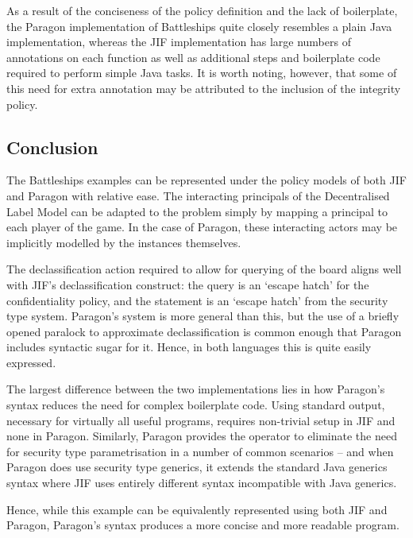 As a result of the conciseness of the policy definition and the lack of boilerplate, the Paragon implementation of Battleships quite closely resembles a plain Java implementation, whereas the JIF implementation has large numbers of annotations on each function as well as additional steps and boilerplate code required to perform simple Java tasks. It is worth noting, however, that some of this need for extra annotation may be attributed to the inclusion of the integrity policy.

\subsection{Conclusion}

The Battleships examples can be represented under the policy models of both JIF and Paragon with relative ease. The interacting principals of the Decentralised Label Model can be adapted to the problem simply by mapping a principal to each player of the game. In the case of Paragon, these interacting actors may be implicitly modelled by the  instances themselves.

The declassification action required to allow for querying of the board aligns well with JIF's declassification construct: the query is an `escape hatch' for the confidentiality policy, and the  statement is an `escape hatch' from the security type system. Paragon's system is more general than this, but the use of a briefly opened paralock to approximate declassification is common enough that Paragon includes syntactic sugar for it. Hence, in both languages this is quite easily expressed.

The largest difference between the two implementations lies in how Paragon's syntax reduces the need for complex boilerplate code. Using standard output, necessary for virtually all useful programs, requires non-trivial setup in JIF and none in Paragon. Similarly, Paragon provides the  operator to eliminate the need for security type parametrisation in a number of common scenarios -- and when Paragon does use security type generics, it extends the standard Java generics syntax where JIF uses entirely different syntax incompatible with Java generics.

Hence, while this example can be equivalently represented using both JIF and Paragon, Paragon's syntax produces a more concise and more readable program.